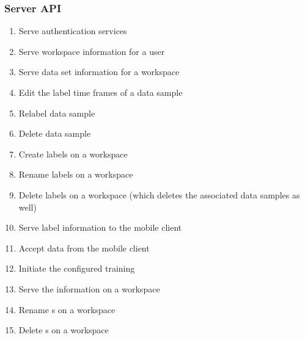 \subsubsection{Server API}
\begin{enumerate}[resume*]
    \item \label{itm:authentication}Serve authentication services
    \item Serve \gls{workspace} information for a user
    \item Serve data set information for a workspace
    \item Edit the \gls{label} time frames of a \gls{data sample}
    \item Relabel \gls{data sample}
    \item Delete \gls{data sample}
    \item Create labels on a workspace
    \item Rename labels on a workspace
    \item Delete labels on a \gls{workspace} (which deletes the associated \glspl{data sample} as well)
    \item Serve \gls{label} information to the mobile client
    \item Accept data from the mobile client
    \item Initiate the configured  training
    \item Serve the  information on a workspace
    \item Rename s on a workspace
    \item Delete s on a workspace
\end{enumerate}

